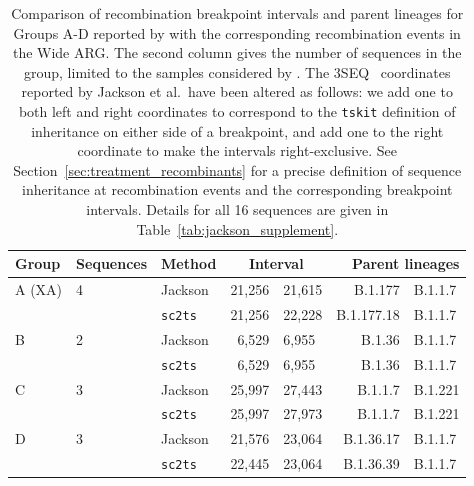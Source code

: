 \documentclass{article}
\begin{document}
\begin{table} \centering
\begin{tabular}{lllr@{--}lr@{+}l}
\toprule
Group        & Sequences & Method & \multicolumn{2}{c}{Interval}
    & \multicolumn{2}{r}{Parent lineages} \\
\midrule
A (XA)       & 4   & Jackson        &  21,256&21,615 & B.1.177&B.1.1.7 \\
             &     &\texttt{sc2ts} &  21,256&22,228 & B.1.177.18&B.1.1.7 \\
\cmidrule{3-7}
B            & 2   & Jackson        &  6,529&6,955 & B.1.36&B.1.1.7  \\
             &     &\texttt{sc2ts} &  6,529&6,955 & B.1.36&B.1.1.7  \\
\cmidrule{3-7}
C            & 3   &Jackson        &  25,997&27,443 &  B.1.1.7&B.1.221 \\
             &     & \texttt{sc2ts} &  25,997&27,973 &  B.1.1.7&B.1.221 \\
\cmidrule{3-7}
D            & 3   & Jackson        &  21,576&23,064 &  B.1.36.17&B.1.1.7 \\
             &     & \texttt{sc2ts} &  22,445&23,064 &  B.1.36.39&B.1.1.7 \\
\bottomrule
\end{tabular}
\caption{\label{tab:jackson}Comparison of recombination breakpoint
intervals and parent lineages for Groups A-D
reported by \cite{Jackson2021-ik} with the corresponding
recombination events in the Wide ARG.
The second column gives the number of sequences in the group,
limited to the samples considered by \citet{Jackson2021-ik}.
The 3SEQ~\citep{boni2007exact} coordinates
reported by Jackson et al.\ have been altered as follows: we
add one to both left and right coordinates to correspond to the
\texttt{tskit} definition of inheritance on either side of a breakpoint,
and add one to the right coordinate to make the intervals
right-exclusive. See Section~\ref{sec:treatment_recombinants}
for a precise definition of sequence inheritance at recombination
events and the corresponding breakpoint intervals.
Details for all 16 sequences are
given in Table~\ref{tab:jackson_supplement}.}
\end{table}
\end{document}
